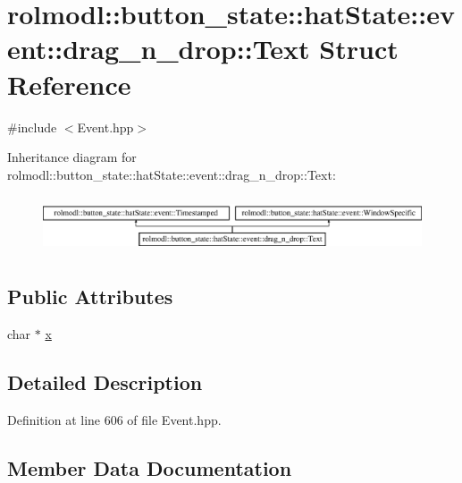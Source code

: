 \hypertarget{structrolmodl_1_1button__state_1_1hat_state_1_1event_1_1drag__n__drop_1_1_text}{}\section{rolmodl\+::button\+\_\+state\+::hat\+State\+::event\+::drag\+\_\+n\+\_\+drop\+::Text Struct Reference}
\label{structrolmodl_1_1button__state_1_1hat_state_1_1event_1_1drag__n__drop_1_1_text}


{\ttfamily \#include $<$Event.\+hpp$>$}

Inheritance diagram for rolmodl\+::button\+\_\+state\+::hat\+State\+::event\+::drag\+\_\+n\+\_\+drop\+::Text\+:\begin{figure}[H]
\begin{center}
\leavevmode
\includegraphics[height=1.696970cm]{structrolmodl_1_1button__state_1_1hat_state_1_1event_1_1drag__n__drop_1_1_text}
\end{center}
\end{figure}
\subsection*{Public Attributes}
\begin{DoxyCompactItemize}
\item 
char $\ast$ \mbox{\hyperlink{structrolmodl_1_1button__state_1_1hat_state_1_1event_1_1drag__n__drop_1_1_text_a13db5913651e79289927108294d8654d}{x}}
\end{DoxyCompactItemize}


\subsection{Detailed Description}


Definition at line 606 of file Event.\+hpp.



\subsection{Member Data Documentation}
\mbox{\label{structrolmodl_1_1button__state_1_1hat_state_1_1event_1_1drag__n__drop_1_1_text_a13db5913651e79289927108294d8654d}} 
